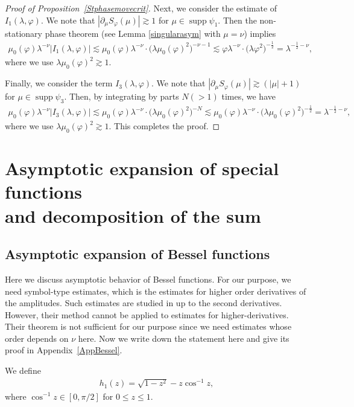 \documentclass[10pt,a4paper]{amsart}
\numberwithin{equation}{section}
\DeclareMathOperator{\supp}{supp}%
\def\f{\varphi}
\def\g{\psi}
\def\l{\lambda}
\def\m{\mu}
\def\n{\nu}
\def\pa{\partial}
\begin{document}
\begin{proof}[Proof of Proposition~\ref{Stphasemovecrit}]
Next, we consider the estimate of $I_{1}(\l,\f)$. We note that $|\pa_{\m}S_{\f}(\m)|\gtrsim 1$ for $\m\in \supp \g_1$.
Then the non-stationary phase theorem (see Lemma \ref{singularasym} with $\m=\n$) implies
\begin{align*}
\m_0(\f)\l^{-\n}|I_1(\l,\f)|\lesssim \m_0(\f)\l^{-\n}\cdot \bigl(\l \m_0(\f)^2\bigr)^{-\n-1}\lesssim \f\l^{-\n}\cdot \bigl(\l \f^2\bigr)^{-\frac{1}{2}}=\l^{-\frac{1}{2}-\n},
\end{align*}
where we use $\l \m_0(\f)^2\gtrsim 1$.

Finally, we consider the term $I_{3}(\l,\f)$. We note that $|\pa_{\m}S_{\f}(\m)|\gtrsim (|\m|+1)$ for $\m\in \supp \g_3$. Then, by integrating by parts $N(>1)$ times, we have
\begin{align*}
\m_0(\f)\l^{-\n}|I_3(\l,\f)|\lesssim \m_0(\f)\l^{-\n}\cdot \bigl(\l \m_0(\f)^2\bigr)^{-N}\lesssim \m_0(\f)\l^{-\n}\cdot \bigl(\l \m_0(\f)^2\bigr)^{-\frac{1}{2}}=\l^{-\frac{1}{2}-\n},
\end{align*}
where we use $\l \m_0(\f)^2\gtrsim 1$. This completes the proof.
\end{proof}

\section[Asymptotic expansion of special functions and decomposition of the sum]{Asymptotic expansion of special functions\\ and decomposition of the sum}

\subsection{Asymptotic expansion of Bessel functions}


Here we discuss asymptotic behavior of Bessel functions. For our purpose, we need symbol-type estimates, which is the estimates for higher order derivatives of the amplitudes. Such estimates are studied in \cite[Theorem 9.1]{IJ} up to the second derivatives. However, their method cannot be applied to estimates for higher-derivatives. Their theorem is not sufficient for our purpose since we need estimates whose order depends on $\n$ here.
Now we write down the statement here and give its proof in Appendix~\ref{AppBessel}.

We define
\begin{align}\label{hdef}
h_1(z)=\sqrt{1-z^2}-z\cos^{-1} z,
\end{align}
where $\cos^{-1} z\in [0,\pi/2]$ for $0\leq z\leq 1$.
\end{document}
